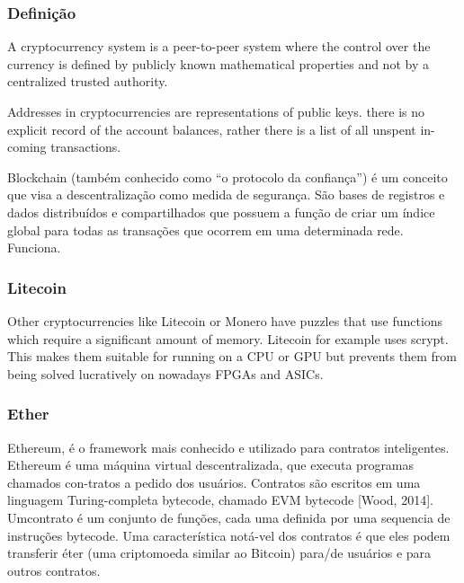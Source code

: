 \documentclass[
	article,			%
	12pt,				%
	openright,			%
	oneside,			%
	a4paper,			%
	chapter=TITLE,		%
	section=TITLE,		%
	subsection=TITLE,	%
	subsubsection=TITLE,%
	subsubsubsection=TITLE, %
	english,			%
	brazil,				%
	]{abntex2}
\begin{document}
\subsubsection{Definição}

A cryptocurrency system is a peer-to-peer system where the control over the currency is defined by publicly known mathematical properties and not by a centralized trusted authority.

\cite{Weber2012}

Addresses in cryptocurrencies are representations of public keys. there is no explicit record of the account balances, rather there is a list of all unspent in-coming transactions.
\cite{Weber2012}

Blockchain (também conhecido como “o protocolo da confiança”) é um conceito que visa a descentralização como medida de segurança. São bases de registros e dados distribuídos e compartilhados que possuem a função de criar um índice global para todas as transações que ocorrem em uma determinada rede. Funciona.

\cite{LChicarino}


\subsubsection{Litecoin}

Other cryptocurrencies like Litecoin or Monero have puzzles that use functions which require a significant amount of memory. Litecoin for example uses scrypt. This makes them suitable for running on a CPU or GPU but prevents them
from being solved lucratively on nowadays FPGAs and ASICs.

\cite{Weber2012}

\subsubsection{Ether}

Ethereum, é o framework mais conhecido e utilizado para contratos inteligentes. Ethereum é uma máquina virtual descentralizada, que executa programas chamados con-tratos a pedido dos usuários. Contratos são escritos em uma linguagem Turing-completa bytecode, chamado EVM bytecode [Wood, 2014]. Umcontrato é um conjunto de funções, cada uma definida por uma sequencia de instruções bytecode. Uma característica notá-vel dos contratos é que eles podem transferir éter (uma criptomoeda similar ao Bitcoin) para/de usuários e para outros contratos.
\end{document}
